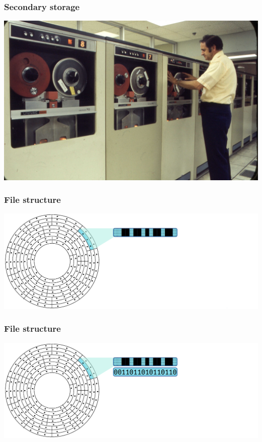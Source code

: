 \documentclass[11pt]{beamer}
\begin{document}

\begin{frame}[fragile]
  \frametitle{Secondary storage}

  \includegraphics[width=\textwidth]{./img/file-structure-drive.png}
\end{frame}


\begin{frame}[fragile]
  \frametitle{File structure}

  \includegraphics[width=\textwidth]{./img/file-structure-01.png}
\end{frame}

\begin{frame}[fragile]
  \frametitle{File structure}

  \includegraphics[width=\textwidth]{./img/file-structure-02.png}
\end{frame}
\end{document}
